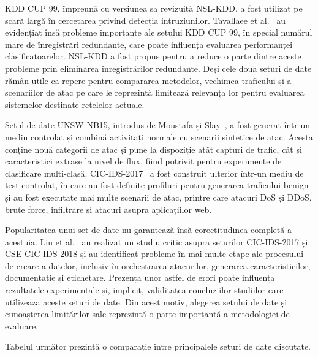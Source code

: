 KDD CUP 99, împreună cu versiunea sa revizuită NSL-KDD, a fost utilizat pe scară largă în cercetarea privind detecția intruziunilor. Tavallaee et al.~\cite{tavallaee2009kdd} au evidențiat însă probleme importante ale setului KDD CUP 99, în special numărul mare de înregistrări redundante, care poate influența evaluarea performanței clasificatoarelor. NSL-KDD a fost propus pentru a reduce o parte dintre aceste probleme prin eliminarea înregistrărilor redundante. Deși cele două seturi de date rămân utile ca repere pentru compararea metodelor, vechimea traficului și a scenariilor de atac pe care le reprezintă limitează relevanța lor pentru evaluarea sistemelor destinate rețelelor actuale.

Setul de date UNSW-NB15, introdus de Moustafa și Slay~\cite{moustafa2015unsw}, a fost generat într-un mediu controlat și combină activități normale cu scenarii sintetice de atac. Acesta conține nouă categorii de atac și pune la dispoziție atât capturi de trafic, cât și caracteristici extrase la nivel de flux, fiind potrivit pentru experimente de clasificare multi-clasă. CIC-IDS-2017~\cite{sharafaldin2018cicids} a fost construit ulterior într-un mediu de test controlat, în care au fost definite profiluri pentru generarea traficului benign și au fost executate mai multe scenarii de atac, printre care atacuri DoS și DDoS, brute force, infiltrare și atacuri asupra aplicațiilor web.

Popularitatea unui set de date nu garantează însă corectitudinea completă a acestuia. Liu et al.~\cite{liu2022error} au realizat un studiu critic asupra seturilor CIC-IDS-2017 și CSE-CIC-IDS-2018 și au identificat probleme în mai multe etape ale procesului de creare a datelor, inclusiv în orchestrarea atacurilor, generarea caracteristicilor, documentație și etichetare. Prezența unor astfel de erori poate influența rezultatele experimentale și, implicit, validitatea concluziilor studiilor care utilizează aceste seturi de date. Din acest motiv, alegerea setului de date și cunoașterea limitărilor sale reprezintă o parte importantă a metodologiei de evaluare.

Tabelul următor prezintă o comparație între principalele seturi de date discutate.

